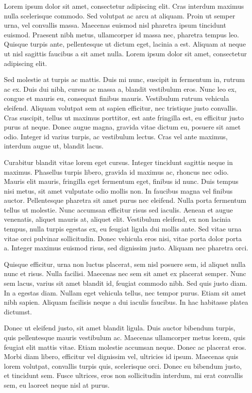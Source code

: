 

Lorem ipsum dolor sit amet, consectetur adipiscing elit. Cras interdum maximus nulla scelerisque commodo. Sed volutpat ac arcu at aliquam. Proin ut semper urna, vel convallis massa. Maecenas euismod nisl pharetra ipsum tincidunt euismod. Praesent nibh metus, ullamcorper id massa nec, pharetra tempus leo. Quisque turpis ante, pellentesque ut dictum eget, lacinia a est. Aliquam at neque ut nisl sagittis faucibus a sit amet nulla. Lorem ipsum dolor sit amet, consectetur adipiscing elit.

Sed molestie at turpis ac mattis. Duis mi nunc, suscipit in fermentum in, rutrum ac ex. Duis dui nibh, cursus ac massa a, blandit vestibulum eros. Nunc leo ex, congue et mauris eu, consequat finibus mauris. Vestibulum rutrum vehicula eleifend. Aliquam volutpat sem at sapien efficitur, nec tristique justo convallis. Cras suscipit, tellus ut maximus porttitor, est ante fringilla est, eu efficitur justo purus at neque. Donec augue magna, gravida vitae dictum eu, posuere sit amet odio. Integer id varius turpis, ac vestibulum lectus. Cras vel ante maximus, interdum augue ut, blandit lacus.

Curabitur blandit vitae lorem eget cursus. Integer tincidunt sagittis neque in maximus. Phasellus turpis libero, gravida id maximus ac, rhoncus nec odio. Mauris elit mauris, fringilla eget fermentum eget, finibus id nunc. Duis tempus nisi metus, sit amet vulputate odio mollis non. In faucibus magna vel finibus auctor. Pellentesque pharetra sit amet purus nec eleifend. Nulla porta fermentum tellus ut molestie. Nunc accumsan efficitur risus sed iaculis. Aenean et augue venenatis, aliquet mauris at, aliquet elit. Vestibulum eleifend, ex non lacinia tempus, nulla turpis egestas ex, eu feugiat ligula dui mollis ante. Sed vitae urna vitae orci pulvinar sollicitudin. Donec vehicula eros nisi, vitae porta dolor porta a. Integer maximus euismod risus, sed dignissim justo. Aliquam nec pharetra orci.

Quisque efficitur, urna non luctus placerat, sem nisl posuere sem, id aliquet nulla nunc et risus. Nulla facilisi. Maecenas nec sem sit amet ex placerat semper. Nunc sem lacus, varius sit amet blandit id, feugiat commodo nibh. Sed quis justo diam. In a egestas diam. Nullam eget vehicula tellus, nec tempor purus. Etiam sit amet nibh sapien. Aliquam facilisis neque a dui iaculis faucibus. In hac habitasse platea dictumst.

Donec ut eleifend justo, sit amet blandit ligula. Duis auctor bibendum turpis, quis pellentesque mauris vestibulum ac. Maecenas ullamcorper metus lorem, quis feugiat elit mattis vitae. Etiam molestie accumsan neque. Donec ac placerat eros. Morbi diam libero, efficitur vel dignissim vel, ultricies id ipsum. Maecenas quis lorem volutpat, convallis turpis quis, scelerisque orci. Donec eu bibendum justo, et tincidunt sem. Fusce ultrices, eros non sollicitudin interdum, mi erat convallis sem, eu laoreet neque nisl at purus.

